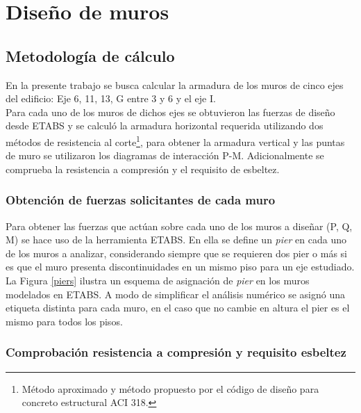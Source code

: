 \newpage
\section{Diseño de muros}

\subsection{Metodología de cálculo}

En la presente trabajo se busca calcular la armadura de los muros de cinco ejes del edificio: Eje 6, 11, 13, G entre 3 y 6 y el eje I. \\

Para cada uno de los muros de dichos ejes se obtuvieron las fuerzas de diseño desde ETABS y se calculó la armadura horizontal requerida utilizando dos métodos de resistencia al corte\footnote{Método aproximado y método propuesto por el código de diseño para concreto estructural ACI 318.},  para obtener la armadura vertical y las puntas de muro se utilizaron los diagramas de interacción P-M. Adicionalmente se comprueba la resistencia a compresión y el requisito de esbeltez.

\subsubsection{Obtención de fuerzas solicitantes de cada muro}

Para obtener las fuerzas que actúan sobre cada uno de los muros a diseñar (P, Q, M) se hace uso de la herramienta ETABS. En ella se define un \textit{pier} en cada uno de los muros a analizar, considerando siempre que se requieren dos pier o más si es que el muro presenta discontinuidades en un mismo piso para un eje estudiado. \\

La Figura \ref{piers} ilustra un esquema de asignación de \textit{pier} en los muros modelados en ETABS. A modo de simplificar el análisis numérico se asignó una etiqueta distinta para cada muro, en el caso que no cambie en altura el pier es el mismo para todos los pisos.


\newpage
\subsubsection{Comprobación resistencia a compresión y requisito esbeltez}

